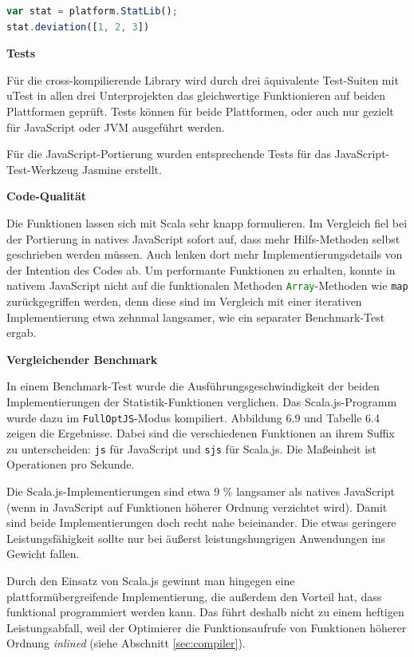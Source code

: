\documentclass[a4paper, 12pt, hidelinks, listof=totoc, listoftables=totoc, bibliography=totoc]{scrreprt}
\newcommand{\code}[1]{\lstinline[language=Scala, style=inline]|#1|}
\newcommand{\js}[1]{\lstinline[language=JavaScript, style=inline]|#1|}
\newcommand{\MyMiniSec}[1]{\rmfamily\fontsize{12}{15}\selectfont
	\vspace{7pt}\textbf{#1} %
}
\begin{document}
\begin{lstlisting}[language=JavaScript, style=snippet]
var stat = platform.StatLib();
stat.deviation([1, 2, 3])
\end{lstlisting}


\MyMiniSec{Tests}

Für die cross-kompilierende Library wird durch drei äquivalente Test-Suiten mit uTest in allen drei Unterprojekten das gleichwertige Funktionieren auf beiden Plattformen geprüft. Tests können für beide Plattformen, oder auch nur gezielt für JavaScript oder \ac{JVM} ausgeführt werden.

Für die JavaScript-Portierung wurden entsprechende 
Tests für das JavaScript-Test-Werkzeug Jasmine erstellt.


\MyMiniSec{Code-Qualität}

Die Funktionen lassen sich mit Scala sehr knapp formulieren. Im Vergleich fiel bei der Portierung in natives JavaScript sofort auf, dass mehr Hilfs-Methoden selbst geschrieben werden müssen. Auch lenken dort mehr Implementierungsdetails von der Intention des Codes ab. Um performante Funktionen zu erhalten, konnte in nativem JavaScript nicht auf die funktionalen Methoden \js{Array}-Methoden wie \js{map} zurückgegriffen werden, denn diese sind im Vergleich mit einer iterativen Implementierung etwa zehnmal langsamer, wie ein separater Benchmark-Test ergab.


\MyMiniSec{Vergleichender Benchmark}

In einem Benchmark-Test wurde die Ausführungsgeschwindigkeit der beiden Implementierungen der Statistik-Funktionen verglichen. Das Scala.js-Programm wurde dazu im \code{FullOptJS}-Modus kompiliert. Abbildung 6.9 und Tabelle 6.4 zeigen die Ergebnisse. Dabei sind die verschiedenen Funktionen an ihrem Suffix zu unterscheiden: \code{js} für JavaScript und \code{sjs} für Scala.js. Die Maßeinheit ist Operationen pro Sekunde.

Die Scala.js-Implementierungen sind etwa 9 \% langsamer als natives JavaScript (wenn in JavaScript auf Funktionen höherer Ordnung verzichtet wird). Damit sind beide Implementierungen doch recht nahe beieinander. Die etwas geringere Leistungsfähigkeit sollte nur bei äußerst leistungshungrigen Anwendungen ins Gewicht fallen.

Durch den Einsatz von Scala.js gewinnt man hingegen eine plattformübergreifende Implementierung, die außerdem den Vorteil hat, dass funktional programmiert werden kann. Das führt deshalb nicht zu einem heftigen Leistungsabfall, weil der Optimierer die Funktionsaufrufe von Funktionen höherer Ordnung \emph{inlined} (siehe Abschnitt \ref{sec:compiler}).
\end{document}
